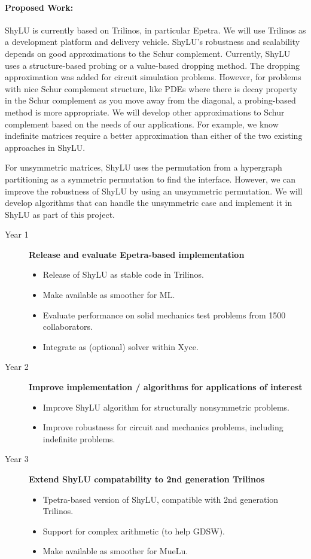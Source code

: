 \documentclass[10pt]{amsart}
\begin{document}
\paragraph{\bf Proposed Work:}
ShyLU is currently based on Trilinos, in particular Epetra.
We will use Trilinos as a development platform and delivery vehicle.
ShyLU's robustness and scalability depends on good
approximations to the Schur complement. Currently, ShyLU uses a
structure-based probing
or a value-based dropping method. The dropping approximation
was added for circuit simulation problems. However, for problems
with nice Schur complement structure, like PDEs where there is decay
property in the Schur complement as you move away from the diagonal,
a probing-based method is more appropriate. We will develop other
approximations to Schur complement based on the needs of our applications. For
example, we know indefinite matrices require a better approximation than either
of the two existing approaches in ShyLU.

For unsymmetric matrices, ShyLU
uses the permutation from a hypergraph partitioning as a symmetric
permutation to find the interface. However, we can improve the robustness of ShyLU by
using an unsymmetric permutation. We will develop algorithms that can handle
the unsymmetric case and implement it in ShyLU as part of this project.

\begin{description}
\item[Year 1] {\bf Release and evaluate Epetra-based implementation}
  \begin{itemize} 
  \item Release of ShyLU as stable code in Trilinos.
  \item Make available as smoother for ML.
  \item Evaluate performance on solid mechanics test problems from 1500 collaborators.
  \item Integrate as (optional) solver within Xyce.
  \end{itemize}
\item[Year 2] {\bf Improve implementation / algorithms for applications of interest}
  \begin{itemize}
  \item Improve ShyLU algorithm for structurally nonsymmetric problems.
  \item Improve robustness for circuit and mechanics problems, including indefinite problems.
  \end{itemize}
\item[Year 3] {\bf Extend ShyLU compatability to 2nd generation Trilinos}
  \begin{itemize}
  \item Tpetra-based version of ShyLU, compatible with 2nd generation Trilinos.
  \item Support for complex arithmetic (to help GDSW).
  \item Make available as smoother for MueLu.
  \end{itemize}
\end{description}
\end{document}
